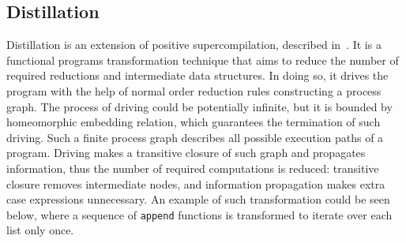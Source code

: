 
\subsection{Distillation}

Distillation is an extension of positive supercompilation, described in~\cite{distillation}. It is a functional programs transformation technique that aims to reduce the number of required reductions and intermediate data structures. In doing so, it drives the program with the help of normal order reduction rules constructing a process graph. The process of driving could be potentially infinite, but it is bounded by homeomorphic embedding relation, which guarantees the termination of such driving. Such a finite process graph describes all possible execution paths of a program. Driving makes a transitive closure of such graph and propagates information, thus the number of required computations is reduced: transitive closure removes intermediate nodes, and information propagation makes extra case expressions unnecessary. An example of such transformation could be seen below, where a sequence of \texttt{append} functions is transformed to iterate over each list only once. 



